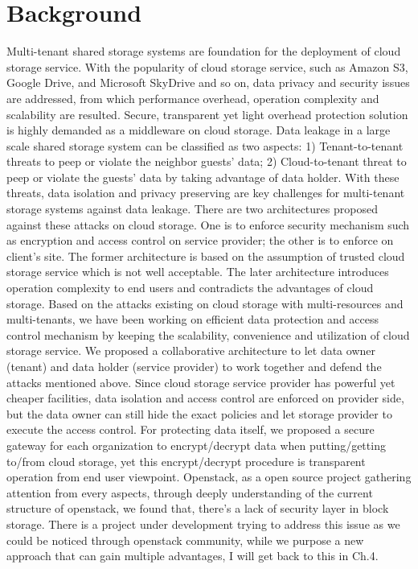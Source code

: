 \documentclass[10pt]{report}
\begin{document}
		\section{Background}
		Multi-tenant shared storage systems are foundation for the deployment of cloud storage service. With the popularity of cloud storage service, such as Amazon S3, Google Drive, and Microsoft SkyDrive and so on, data privacy and security issues are addressed, from which performance overhead, operation complexity and scalability are resulted. Secure, transparent yet light overhead protection solution is highly demanded as a middleware on cloud storage.
		Data leakage in a large scale shared storage system can be classified as two aspects: 1) Tenant-to-tenant threats to peep or violate the neighbor guests' data; 2) Cloud-to-tenant threat to peep or violate the guests' data by taking advantage of data holder. With these threats, data isolation and privacy preserving are key challenges for multi-tenant storage systems against data leakage.
		There are two architectures proposed against these attacks on cloud storage. One is to enforce security mechanism such as encryption and access control on service provider; the other is to enforce on client’s site. The former architecture is based on the assumption of trusted cloud storage service which is not well acceptable. The later architecture introduces operation complexity to end users and contradicts the advantages of cloud storage.
   		Based on the attacks existing on cloud storage with multi-resources and multi-tenants, we have been working on efficient data protection and access control mechanism by keeping the scalability, convenience and utilization of cloud storage 			service. We proposed a collaborative architecture to let data owner (tenant) and data holder (service provider) to work together and defend the attacks mentioned above. Since cloud storage service provider has powerful yet cheaper facilities, 			data isolation and access control are enforced on provider side, but the data owner can still hide the exact policies and let storage provider to execute the access control.  For protecting data itself, we proposed a secure gateway for each 		  		organization to encrypt/decrypt data when putting/getting to/from cloud storage, yet this encrypt/decrypt procedure is transparent operation from end user viewpoint.
		Openstack\cite{openstackwiki}, as a open source project gathering attention from every aspects, through deeply understanding of the current structure of openstack, we found that, there's a lack of security layer in block storage. There is a project under development \cite{volumeencryptionwiki} trying to address this issue as we could be noticed through openstack community, while we purpose a new approach that can gain multiple advantages, I will get back to this in Ch.4. 
		
\end{document}
